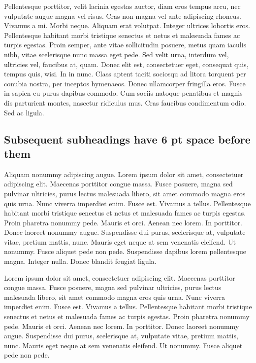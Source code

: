 \documentclass{biorxiv}
\begin{document}
Pellentesque porttitor, velit lacinia egestas auctor, diam eros tempus arcu,
nec vulputate augue magna vel risus. Cras non magna vel ante adipiscing
rhoncus. Vivamus a mi. Morbi neque. Aliquam erat volutpat. Integer ultrices
lobortis eros. Pellentesque habitant morbi tristique senectus et netus et
malesuada fames ac turpis egestas. Proin semper, ante vitae sollicitudin
posuere, metus quam iaculis nibh, vitae scelerisque nunc massa eget pede. Sed
velit urna, interdum vel, ultricies vel, faucibus at, quam. Donec elit est,
consectetuer eget, consequat quis, tempus quis, wisi. In in nunc. Class aptent
taciti sociosqu ad litora torquent per conubia nostra, per inceptos hymenaeos.
Donec ullamcorper fringilla eros. Fusce in sapien eu purus dapibus commodo.
Cum sociis natoque penatibus et magnis dis parturient montes, nascetur
ridiculus mus. Cras faucibus condimentum odio. Sed ac ligula.

\subsection{Subsequent subheadings have 6 pt space before them}
Aliquam nonummy adipiscing augue. Lorem ipsum dolor sit amet, consectetuer
adipiscing elit. Maecenas porttitor congue massa. Fusce posuere, magna sed
pulvinar ultricies, purus lectus malesuada libero, sit amet commodo magna eros
quis urna. Nunc viverra imperdiet enim. Fusce est. Vivamus a tellus.
Pellentesque habitant morbi tristique senectus et netus et malesuada fames ac
turpis egestas. Proin pharetra nonummy pede. Mauris et orci. Aenean nec lorem.
In porttitor. Donec laoreet nonummy augue. Suspendisse dui purus, scelerisque
at, vulputate vitae, pretium mattis, nunc. Mauris eget neque at sem venenatis
eleifend. Ut nonummy. Fusce aliquet pede non pede. Suspendisse dapibus lorem
pellentesque magna. Integer nulla. Donec blandit feugiat ligula.

Lorem ipsum dolor sit amet, consectetuer adipiscing elit. Maecenas porttitor
congue massa. Fusce posuere, magna sed pulvinar ultricies, purus lectus
malesuada libero, sit amet commodo magna eros quis urna. Nunc viverra
imperdiet enim. Fusce est. Vivamus a tellus. Pellentesque habitant morbi
tristique senectus et netus et malesuada fames ac turpis egestas. Proin
pharetra nonummy pede. Mauris et orci. Aenean nec lorem. In porttitor. Donec
laoreet nonummy augue. Suspendisse dui purus, scelerisque at, vulputate vitae,
pretium mattis, nunc. Mauris eget neque at sem venenatis eleifend. Ut nonummy.
Fusce aliquet pede non pede.
\end{document}
